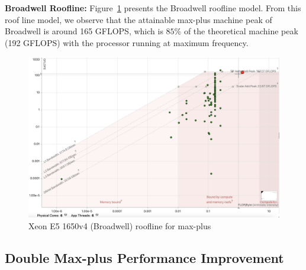 {\textbf{Broadwell Roofline:}} Figure~\ref{fig:roof_line_broad_well} presents the Broadwell roofline model. From this roof line model, we observe that the attainable max-plus machine peak of Broadwell is around 165 GFLOPS, which is $85\%$ of the theoretical machine peak (192 GFLOPS) with the processor running at maximum frequency.

\begin{figure}[htbp]
\centerline{\includegraphics[scale=0.20, trim=0 0 0 0,clip]{content/figures/roofline_broadwell.png}}
\caption{Xeon E5 1650v4 (Broadwell) roofline for max-plus}
\label{fig:roof_line_broad_well}
\end{figure}





\subsection{Double Max-plus Performance Improvement}
